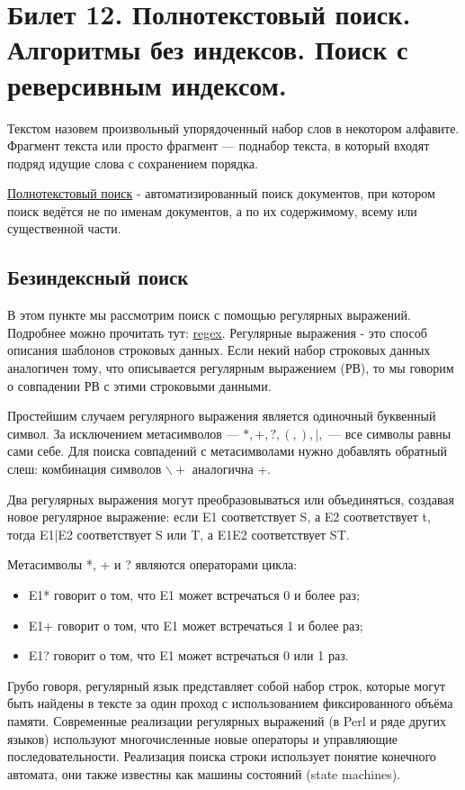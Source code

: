 \newpage
\section {Билет 12. Полнотекстовый поиск. Алгоритмы без индексов. Поиск с реверсивным индексом.}
\begin{defn}
Текстом назовем произвольный упорядоченный набор слов в некотором алфавите. Фрагмент текста или просто фрагмент — поднабор текста, в который входят подряд идущие слова с сохранением порядка. \end{defn}
\href{https://clck.ru/pwwdR}{Полнотекстовый поиск} - автоматизированный поиск документов, при котором поиск ведётся не по именам документов, а по их содержимому, всему или существенной части.

\subsection{Безиндексный поиск}
В этом пункте мы рассмотрим поиск с помощью регулярных выражений. Подробнее можно прочитать тут: \href{https://habr.com/ru/company/vk/blog/270507/}{regex}. Регулярные выражения - это способ описания шаблонов строковых данных. Если некий набор строковых данных аналогичен тому, что описывается регулярным выражением (РВ), то мы говорим о совпадении РВ с этими строковыми данными.

Простейшим случаем регулярного выражения является одиночный буквенный символ. За исключением метасимволов — $*, +, ?, (, ),|,$ — все символы равны сами себе. Для поиска совпадений с метасимволами нужно добавлять обратный слеш: комбинация символов $\backslash +$ аналогична +.

Два регулярных выражения могут преобразовываться или объединяться, создавая новое регулярное выражение: если E1 соответствует S, а E2 соответствует t, тогда E1|E2 соответствует S или T, а E1E2 соответствует ST.

Метасимволы *, + и ? являются операторами цикла:
\begin {itemize}
\item E1* говорит о том, что E1 может встречаться 0 и более раз;
\item E1+ говорит о том, что E1 может встречаться 1 и более раз;
\item E1? говорит о том, что E1 может встречаться 0 или 1 раз.
\end {itemize}

Грубо говоря, регулярный язык представляет собой набор строк, которые могут быть найдены в тексте за один проход с использованием фиксированного объёма памяти. Современные реализации регулярных выражений (в Perl и ряде других языков) используют многочисленные новые операторы и управляющие последовательности. Реализация поиска строки использует понятие конечного автомата, они также известны как машины состояний (state machines). 

